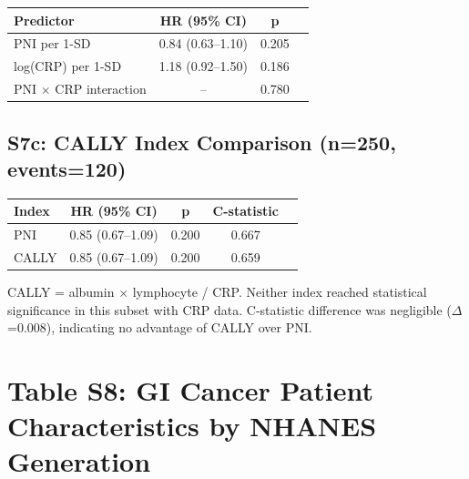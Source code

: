 \documentclass[11pt,a4paper]{article}
\begin{document}
\begin{center}
\begin{tabular}{lccc}
\toprule
Predictor & HR (95\% CI) & p \\
\midrule
PNI per 1-SD & 0.84 (0.63--1.10) & 0.205 \\
log(CRP) per 1-SD & 1.18 (0.92--1.50) & 0.186 \\
PNI $\times$ CRP interaction & -- & 0.780 \\
\bottomrule
\end{tabular}
\end{center}

\subsection*{S7c: CALLY Index Comparison (n=250, events=120)}

\begin{center}
\begin{tabular}{lcccc}
\toprule
Index & HR (95\% CI) & p & C-statistic \\
\midrule
PNI & 0.85 (0.67--1.09) & 0.200 & 0.667 \\
CALLY & 0.85 (0.67--1.09) & 0.200 & 0.659 \\
\bottomrule
\end{tabular}
\end{center}

CALLY = albumin $\times$ lymphocyte / CRP. Neither index reached statistical significance in this subset with CRP data. C-statistic difference was negligible ($\Delta$=0.008), indicating no advantage of CALLY over PNI.

\section*{Table S8: GI Cancer Patient Characteristics by NHANES Generation}
\label{tab:s8}
\end{document}
